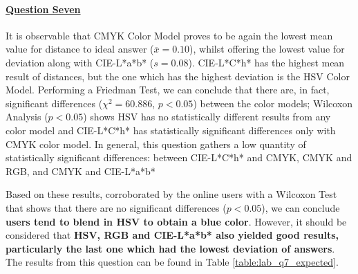 \paragraph{\ul{Question Seven}}
%
It is observable that CMYK Color Model proves to be again the lowest mean value for distance to ideal answer ($\overline{x} = 0.10$), whilst offering the lowest value for deviation along with CIE-L*a*b* ($s = 0.08$). CIE-L*C*h* has the
highest mean result of distances, but the one which has the highest deviation is the HSV Color Model.
Performing a Friedman Test, we can conclude that there are, in fact, significant differences ($\chi^2 = 60.886$, $p < 0.05$) between the color models; Wilcoxon Analysis ($p < 0.05$)
shows HSV has no statistically different results from any color model and CIE-L*C*h* has statistically significant differences only with CMYK color model. In general, this question
gathers a low quantity of statistically significant differences: between CIE-L*C*h* and CMYK, CMYK and RGB, and CMYK and CIE-L*a*b* \par
%
Based on these results, corroborated by the online users with a Wilcoxon Test that shows that there are no significant differences ($p < 0.05$), we can conclude \textbf{users tend
to blend in HSV to obtain a blue color}. However, it should be considered that \textbf{HSV, RGB and CIE-L*a*b* also yielded good results, particularly the last one which had the
lowest deviation of answers}. The results from this question can be found in Table \ref{table:lab_q7_expected}.
%
